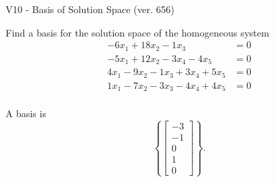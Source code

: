 \begin{exercise}
  \begin{exerciseTitle}V10 - Basis of Solution Space (ver. 656)\end{exerciseTitle}
  \begin{exerciseStatement}
    Find a basis for the solution space of the homogeneous system 
\begin{align*}
 -6 x_ 1 + 18 x_ 2 -1 x_ 3 &= 0  \\ 
  -5 x_ 1 + 12 x_ 2 -3 x_ 4 -4 x_ 5 &= 0  \\ 
  4 x_ 1 -9 x_ 2 -1 x_ 3 + 3 x_ 4 + 5 x_ 5 &= 0  \\ 
  1 x_ 1 -7 x_ 2 -3 x_ 3 -4 x_ 4 + 4 x_ 5 &= 0  \\ 
 \end{align*}


 
  \end{exerciseStatement}

  \begin{exerciseAnswer}
   A basis is   
\[\left\{\left[\begin{array}{c}
-3 \\
-1 \\
0 \\
1 \\
0
\end{array}\right]\right\}.\]

  


  \end{exerciseAnswer}
\end{exercise}